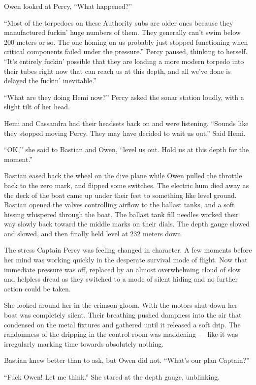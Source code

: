 \documentclass[]{scrbook}
\begin{document}
Owen looked at Percy, ``What happened?''

``Most of the torpedoes on these Authority subs are older ones because
they manufactured fuckin' huge numbers of them. They generally can't
swim below 200 meters or so. The one homing on us probably just stopped
functioning when critical components failed under the pressure.'' Percy
paused, thinking to herself. ``It's entirely fuckin' possible that they
are loading a more modern torpedo into their tubes right now that can
reach us at this depth, and all we've done is delayed the fuckin'
inevitable.''

``What are they doing Hemi now?'' Percy asked the sonar station loudly,
with a slight tilt of her head.

Hemi and Cassandra had their headsets back on and were listening.
``Sounds like they stopped moving Percy. They may have decided to wait
us out.'' Said Hemi.

``OK,'' she said to Bastian and Owen, ``level us out. Hold us at this
depth for the moment.''

Bastian eased back the wheel on the dive plane while Owen pulled the
throttle back to the zero mark, and flipped some switches. The electric
hum died away as the deck of the boat came up under their feet to
something like level ground. Bastian opened the valves controlling
airflow to the ballast tanks, and a soft hissing whispered through the
boat. The ballast tank fill needles worked their way slowly back toward
the middle marks on their dials. The depth gauge slowed and slowed, and
then finally held level at 232 meters down.

The stress Captain Percy was feeling changed in character. A few moments
before her mind was working quickly in the desperate survival mode of
flight. Now that immediate pressure was off, replaced by an almost
overwhelming cloud of slow and helpless dread as they switched to a mode
of silent hiding and no further action could be taken.

She looked around her in the crimson gloom. With the motors shut down
her boat was completely silent. Their breathing pushed dampness into the
air that condensed on the metal fixtures and gathered until it released
a soft drip. The randomness of the dripping in the control room was
maddening --- like it was irregularly marking time towards absolutely
nothing.

Bastian knew better than to ask, but Owen did not. ``What's our plan
Captain?''

``Fuck Owen! Let me think.'' She stared at the depth gauge, unblinking.
\end{document}

